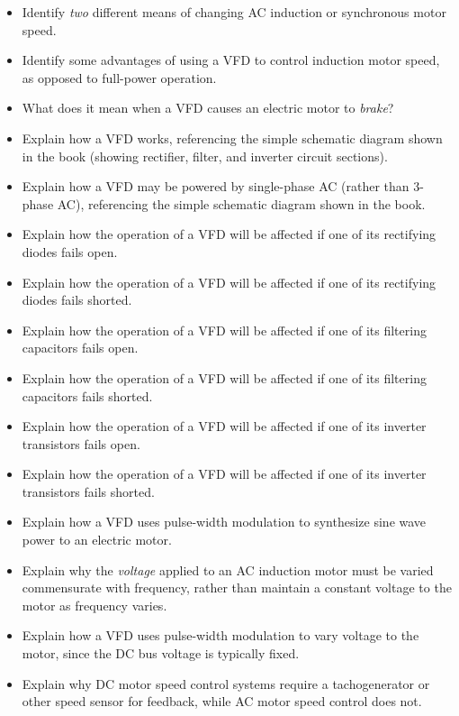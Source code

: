 \begin{itemize}
\item{} Identify {\it two} different means of changing AC induction or synchronous motor speed.
\item{} Identify some advantages of using a VFD to control induction motor speed, as opposed to full-power operation.
\item{} What does it mean when a VFD causes an electric motor to {\it brake}?
\item{} Explain how a VFD works, referencing the simple schematic diagram shown in the book (showing rectifier, filter, and inverter circuit sections).
\item{} Explain how a VFD may be powered by single-phase AC (rather than 3-phase AC), referencing the simple schematic diagram shown in the book.
\item{} Explain how the operation of a VFD will be affected if one of its rectifying diodes fails open.
\item{} Explain how the operation of a VFD will be affected if one of its rectifying diodes fails shorted.
\item{} Explain how the operation of a VFD will be affected if one of its filtering capacitors fails open.
\item{} Explain how the operation of a VFD will be affected if one of its filtering capacitors fails shorted.
\item{} Explain how the operation of a VFD will be affected if one of its inverter transistors fails open.
\item{} Explain how the operation of a VFD will be affected if one of its inverter transistors fails shorted.
\item{} Explain how a VFD uses pulse-width modulation to synthesize sine wave power to an electric motor.
\item{} Explain why the {\it voltage} applied to an AC induction motor must be varied commensurate with frequency, rather than maintain a constant voltage to the motor as frequency varies.
\item{} Explain how a VFD uses pulse-width modulation to vary voltage to the motor, since the DC bus voltage is typically fixed.
\item{} Explain why DC motor speed control systems require a tachogenerator or other speed sensor for feedback, while AC motor speed control does not.
\end{itemize}















